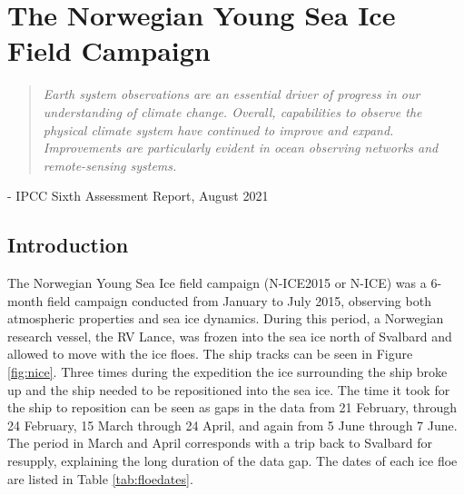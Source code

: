 \chapter{The Norwegian Young Sea Ice Field Campaign}
\vspace{1 cm}
\begin{spacing}{1} \begin{quote} 
\noindent \emph{Earth system observations are an essential driver of progress in our understanding of climate change. Overall, capabilities to observe the physical climate system have continued to improve and expand. Improvements are particularly evident in ocean observing networks and remote-sensing systems.} \end{quote}
\hspace{6 cm} - IPCC Sixth Assessment Report, August 2021  
\end{spacing}
\doublespacing
\section{Introduction}
The Norwegian Young Sea Ice field campaign (N-ICE2015 or N-ICE) was a 6-month field campaign conducted from January to July 2015, observing both atmospheric properties and sea ice dynamics. During this period, a Norwegian research vessel, the RV Lance, was frozen into the sea ice north of Svalbard and allowed to move with the ice floes. The ship tracks can be seen in Figure \ref{fig:nice}. Three times during the expedition the ice surrounding the ship broke up and the ship needed to be repositioned into the sea ice. The time it took for the ship to reposition can be seen as gaps in the data from 21 February, through 24 February, 15 March through 24 April, and again from 5 June through 7 June. The period in March and April corresponds with a trip back to Svalbard for resupply, explaining the long duration of the data gap. The dates of each ice floe are listed in Table \ref{tab:floedates}. 

